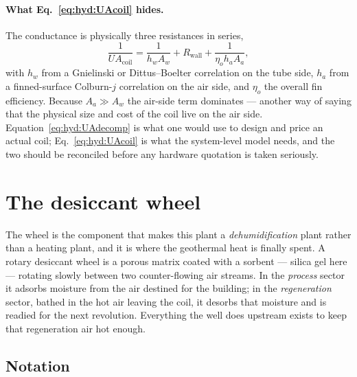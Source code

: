 \documentclass[11pt]{article}
\newcommand{\UA}{\ensuremath{U\!A}}
\begin{document}
\paragraph{What Eq.~\eqref{eq:hyd:UAcoil} hides.} The conductance is physically three
resistances in series,
\begin{equation}
\frac{1}{\UA_{\mathrm{coil}}}
=\frac{1}{h_w A_w}+R_{\mathrm{wall}}+\frac{1}{\eta_o h_a A_a},
\label{eq:hyd:UAdecomp}
\end{equation}
with $h_w$ from a Gnielinski or Dittus--Boelter correlation on the tube side, $h_a$ from a
finned-surface Colburn-$j$ correlation on the air side, and $\eta_o$ the overall fin
efficiency. Because $A_a\gg A_w$ the air-side term dominates --- another way of saying that the
physical size and cost of the coil live on the air side. Equation~\eqref{eq:hyd:UAdecomp} is
what one would use to design and price an actual coil; Eq.~\eqref{eq:hyd:UAcoil} is what the
system-level model needs, and the two should be reconciled before any hardware quotation is
taken seriously.

\section{The desiccant wheel}
\label{sec:dw:main}

The wheel is the component that makes this plant a \emph{dehumidification}
plant rather than a heating plant, and it is where the geothermal heat is
finally spent. A rotary desiccant wheel is a porous matrix coated with a
sorbent --- silica gel here --- rotating slowly between two counter-flowing
air streams. In the \emph{process} sector it adsorbs moisture from the air
destined for the building; in the \emph{regeneration} sector, bathed in the
hot air leaving the coil, it desorbs that moisture and is readied for the
next revolution. Everything the well does upstream exists to keep that
regeneration air hot enough.

\subsection{Notation}
\label{sec:dw:notation}
\end{document}
